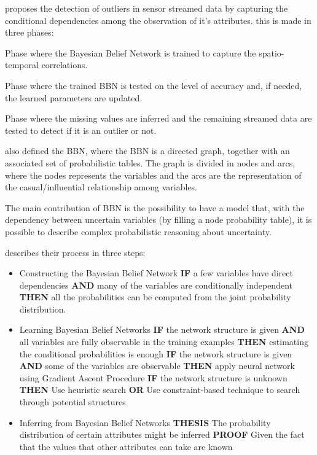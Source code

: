 \cite{class:janakiram:2006} proposes the detection of outliers in sensor streamed data by capturing the conditional dependencies among the observation of it's attributes. this is made in three phases:

\begin{description}
	\setlength\itemsep{-0.5em}
	\item[Training Phase]  
	Phase where the Bayesian Belief Network is trained to capture the spatio-temporal correlations.
	\item[Testing Phase]  
	Phase where the trained BBN is tested on the level of accuracy and, if needed, the learned parameters are updated.
	\item[Inference Phase] 
	Phase where the missing values are inferred and the remaining streamed data are tested to detect if it is an outlier or not.
\end{description}

\cite{class:janakiram:2006} also defined the BBN, where the BBN is a directed graph, together with an associated set of probabilistic tables.
The graph is divided in nodes and arcs, where the nodes represents the variables and the arcs are the representation of the casual/influential relationship among variables.

The main contribution of BBN is the possibility to have a model that, with the dependency between uncertain variables (by filling a node probability table), it is possible to describe complex probabilistic reasoning about uncertainty.

\cite{class:janakiram:2006} describes their process in three steps:

\begin{itemize}
	
	\item Constructing the Bayesian Belief Network
	\subitem \textbf{IF} a few variables have direct dependencies
	\subitem \textbf{AND} many of the variables are conditionally independent
	\subitem \textbf{THEN} all the probabilities can be computed from the joint probability distribution.
	
	\item Learning Bayesian Belief Networks
	\subitem \textbf{IF} the network structure is given
	\subitem \textbf{AND} all variables are fully observable in the training examples
	\subitem \textbf{THEN} estimating the conditional probabilities is enough
	\subitem
	\subitem \textbf{IF} the network structure is given
	\subitem \textbf{AND} some of the variables are observable
	\subitem \textbf{THEN} apply neural network using Gradient Ascent Procedure
	\subitem
	\subitem \textbf{IF} the network structure is unknown
	\subitem \textbf{THEN} Use heuristic search
	\subitem \textbf{OR} Use constraint-based technique to search through potential structures
	
	
	\item Inferring from Bayesian Belief Networks
	\subitem \textbf{THESIS} The probability distribution of certain attributes might be inferred
	\subitem \textbf{PROOF} Given the fact that the values that other attributes can take are known	
\end{itemize}

